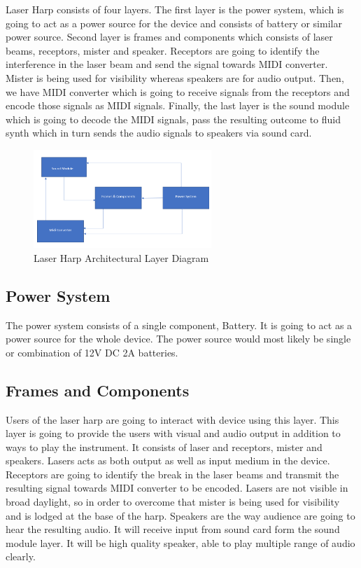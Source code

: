 Laser Harp consists of four layers. The first layer is the power system, which is going to act as a power source for the device and consists of battery or similar power source. Second layer is frames and components which consists of laser beams, receptors, mister and speaker. Receptors are going to identify the interference in the laser beam and send the signal towards MIDI converter. Mister is being used for visibility whereas speakers are for audio output. Then, we have MIDI converter which is going to receive signals from the receptors and encode those signals as MIDI signals. Finally, the last layer is the sound module which is going to decode the MIDI signals, pass the resulting outcome to fluid synth which in turn sends the audio signals to speakers via sound card. 

\begin{figure}[h!]
	\centering
 	\includegraphics[width=0.60\textwidth]{images/layers}
 \caption{Laser Harp Architectural Layer Diagram}
\end{figure}

\subsection{Power System}
The power system consists of a single component, Battery. It is going to act as a power source for the whole device. The power source would most likely be single or combination of 12V DC 2A batteries.


\subsection{Frames and Components}
Users of the laser harp are going to interact with device using this layer. This layer is going to provide the users with visual and audio output in addition to ways to play the instrument. It consists of laser and receptors, mister and speakers. Lasers acts as both output as well as input medium in the device. Receptors are going to identify the break in the laser beams and transmit the resulting signal towards MIDI converter to be encoded. Lasers are not visible in broad daylight, so  in order to overcome that mister is being used for visibility and is lodged at the base of the harp. Speakers are the way audience are going to hear the resulting audio. It will receive input from sound card form the sound module layer. It will be high quality speaker, able to play multiple range of audio clearly.

